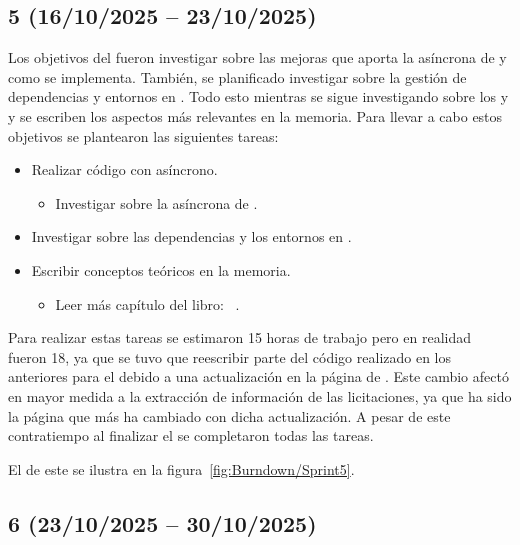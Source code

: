 \subsection{ 5 (16/10/2025 -- 23/10/2025)}
Los objetivos del  fueron investigar sobre las mejoras que aporta la  asíncrona de  y como se implementa. También, se planificado investigar sobre la gestión de dependencias y entornos en . Todo esto mientras se sigue investigando sobre los  y  y se escriben los aspectos más relevantes en la memoria. 
Para llevar a cabo estos objetivos se plantearon las siguientes tareas:
\begin{itemize}
\tightlist
	\item Realizar código con  asíncrono.
	\begin{itemize}
	\tightlist
		\item Investigar sobre la  asíncrona de .
	\end{itemize}
	\item Investigar sobre las dependencias y los entornos en .
	\item Escribir conceptos teóricos en la memoria.
	\begin{itemize}
	\tightlist
		\item Leer más capítulo del libro: ~\cite{book:RAG_SimpleGuide}.
	\end{itemize}
\end{itemize}

Para realizar estas tareas se estimaron 15 horas de trabajo pero en realidad fueron 18, ya que se tuvo que reescribir parte del código realizado en los  anteriores para el  debido a una actualización en la página de \contsec{}. Este cambio afectó en mayor medida a la extracción de información de las licitaciones, ya que ha sido la página que más ha cambiado con dicha actualización. A pesar de este contratiempo al finalizar el  se completaron todas las tareas.

El  de este  se ilustra en la figura~\ref{fig:Burndown/Sprint5}.

\subsection{ 6 (23/10/2025 -- 30/10/2025)}

